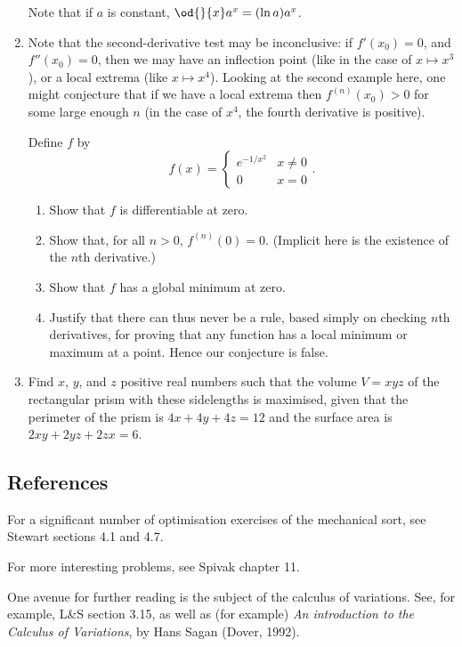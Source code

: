 \begin{enumerate}
        Note that if $ a $ is constant, $ \od{}{x} a^x = (\ln a) a^x $.
  \item Note that the second-derivative test may be inconclusive: if $ f'(x_0) = 0 $, and $ f''(x_0) = 0 $, then we may have
        an inflection point (like in the case of $ x \mapsto x^3 $), or a local extrema (like $ x \mapsto x^4 $). Looking at
        the second example here, one might conjecture that if we have a local extrema then $ f^{(n)}(x_0) > 0 $ for some large
        enough $ n $ (in the case of $ x^4 $, the fourth derivative is positive).

        Define $ f $ by
        \begin{displaymath}
          f(x) = \begin{cases} e^{-1/x^2} & x \neq 0 \\ 0 &x = 0 \end{cases}.
        \end{displaymath}
    \begin{enumerate}
      \item Show that $ f $ is differentiable at zero.
      \item Show that, for all $ n > 0 $, $ f^{(n)}(0) = 0 $. (Implicit here is the existence of the $ n$th derivative.)
      \item Show that $ f $ has a global minimum at zero.
      \item Justify that there can thus never be a rule, based simply on checking $ n$th derivatives, for proving
            that any function has a local minimum or maximum at a point. Hence our conjecture is false.
      \end{enumerate}
  \item Find $ x $, $ y $, and $ z $ positive real numbers such that the volume $ V = xyz $
        of the rectangular prism with these sidelengths is maximised, given that the perimeter
        of the prism is $ 4x + 4y + 4z = 12 $ and the surface area is $ 2xy + 2yz + 2zx = 6 $.
\end{enumerate}

\subsection{References}
For a significant number of optimisation exercises of the mechanical sort, see Stewart sections 4.1 and 4.7.

For more interesting problems, see Spivak chapter 11.

One avenue for further reading is the subject of the calculus of variations. See, for example, L\&S section 3.15,
as well as (for example) \emph{An introduction to the Calculus of Variations}, by Hans Sagan (Dover, 1992).


